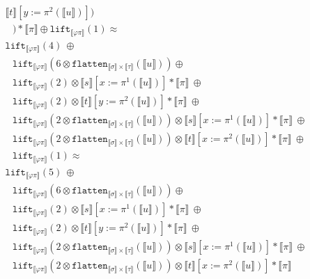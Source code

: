 \documentclass[runningheads,a4paper]{llncs}
\newcommand{\typeinterpret}[1]{\llbracket #1 \rrbracket}
\newcommand{\interpret}[1]{\llbracket #1 \rrbracket}
\newcommand{\flatten}{\mathtt{flatten}}
\newcommand{\lift}{\mathtt{lift}}
\begin{document}
\begin{itemize}
\[\begin{array}{l}
      \interpret{t}[y:=\pi^2(\interpret{u})]) \\
  \phantom{A}) * \typeinterpret{\pi} \oplus
  \lift_{\typeinterpret{\varphi\pi}}(1) \approx \\
  \lift_{\typeinterpret{\varphi\pi}}(4)\ \oplus \\
  \phantom{A}
  \lift_{\typeinterpret{\varphi\pi}}(6 \otimes
      \flatten_{\typeinterpret{\sigma} \times \typeinterpret{\tau}}(
      \interpret{u})) \oplus \\
  \phantom{A}
  \lift_{\typeinterpret{\varphi\pi}}(2) \otimes
    \interpret{s}[x:=\pi^1(\interpret{u})] * \typeinterpret{\pi}\ \oplus\\
  \phantom{A}
  \lift_{\typeinterpret{\varphi\pi}}(2) \otimes
    \interpret{t}[y:=\pi^2(\interpret{u})] * \typeinterpret{\pi}\ \oplus\\
  \phantom{A}
  \lift_{\typeinterpret{\varphi\pi}}(2 \otimes
    \flatten_{\typeinterpret{\sigma} \times \typeinterpret{\tau}}(
      \interpret{u})) \otimes \interpret{s}[x:=\pi^1(\interpret{u})]
      * \typeinterpret{\pi}\ \oplus \\
  \phantom{A}
  \lift_{\typeinterpret{\varphi\pi}}(2 \otimes
    \flatten_{\typeinterpret{\sigma} \times \typeinterpret{\tau}}(
      \interpret{u})) \otimes \interpret{t}[x:=\pi^2(\interpret{u})]
      * \typeinterpret{\pi}\ \oplus \\
  \phantom{A}
  \lift_{\typeinterpret{\varphi\pi}}(1) \approx \\
  \lift_{\typeinterpret{\varphi\pi}}(5)\ \oplus \\
  \phantom{A}
  \lift_{\typeinterpret{\varphi\pi}}(6 \otimes
      \flatten_{\typeinterpret{\sigma} \times \typeinterpret{\tau}}(
      \interpret{u})) \oplus \\
  \phantom{A}
  \lift_{\typeinterpret{\varphi\pi}}(2) \otimes
    \interpret{s}[x:=\pi^1(\interpret{u})] * \typeinterpret{\pi}\ \oplus\\
  \phantom{A}
  \lift_{\typeinterpret{\varphi\pi}}(2) \otimes
    \interpret{t}[y:=\pi^2(\interpret{u})] * \typeinterpret{\pi}\ \oplus\\
  \phantom{A}
  \lift_{\typeinterpret{\varphi\pi}}(2 \otimes
    \flatten_{\typeinterpret{\sigma} \times \typeinterpret{\tau}}(
      \interpret{u})) \otimes \interpret{s}[x:=\pi^1(\interpret{u})]
      * \typeinterpret{\pi}\ \oplus \\
  \phantom{A}
  \lift_{\typeinterpret{\varphi\pi}}(2 \otimes
    \flatten_{\typeinterpret{\sigma} \times \typeinterpret{\tau}}(
      \interpret{u})) \otimes \interpret{t}[x:=\pi^2(\interpret{u})]
      * \typeinterpret{\pi} \\
  \end{array}
  \]


\end{itemize}
\end{document}

